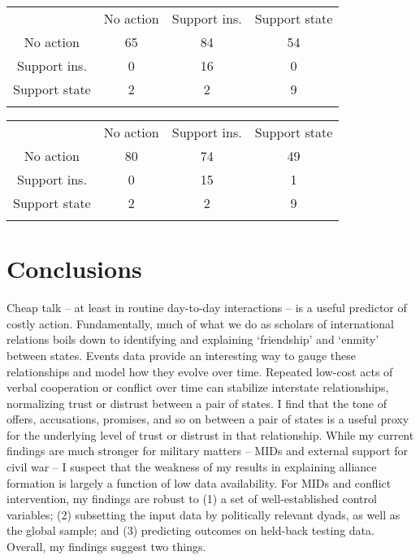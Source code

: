 \documentclass[10pt,]{article}
\let\stdsection\section
\renewcommand\section{\newpage\stdsection}
\begin{document}
\begin{centering}
\begin{tabularx}{\textwidth}{c|c c c |}
\label{tab:ConfMatStruct}
 & No action & Support ins. & Support state \\
\hhline{----}
No action & 65 \cellcolor[gray]{.8} & 84 & 54  \\
Support ins. & 0 & 16 \cellcolor[gray]{.8} & 0  \\
Support state & 2 & 2 & 9 \cellcolor[gray]{.8} \\
\hhline{~---}
\end{tabularx}


\begin{tabularx}{\textwidth}{c|c c c |}
\label{tab:ConfMatFull}
 & No action & Support ins. & Support state \\
\hhline{----}
No action & 80 \cellcolor[gray]{.8} & 74 & 49  \\
Support ins. & 0 & 15 \cellcolor[gray]{.8} & 1  \\
Support state & 2 & 2 & 9 \cellcolor[gray]{.8} \\
\hhline{~---}
\end{tabularx}

\end{centering}

\section{Conclusions}\label{conclusions}

Cheap talk -- at least in routine day-to-day interactions -- is a useful
predictor of costly action. Fundamentally, much of what we do as
scholars of international relations boils down to identifying and
explaining `friendship' and `enmity' between states. Events data provide
an interesting way to gauge these relationships and model how they
evolve over time. Repeated low-cost acts of verbal cooperation or
conflict over time can stabilize interstate relationships, normalizing
trust or distrust between a pair of states. I find that the tone of
offers, accusations, promises, and so on between a pair of states is a
useful proxy for the underlying level of trust or distrust in that
relationship. While my current findings are much stronger for military
matters -- MIDs and external support for civil war -- I suspect that the
weakness of my results in explaining alliance formation is largely a
function of low data availability. For MIDs and conflict intervention,
my findings are robust to (1) a set of well-established control
variables; (2) subsetting the input data by politically relevant dyads,
as well as the global sample; and (3) predicting outcomes on held-back
testing data. Overall, my findings suggest two things.
\end{document}
